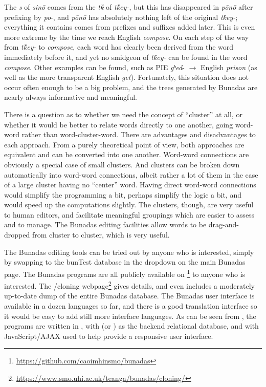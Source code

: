 \documentclass[output=paper,colorlinks,citecolor=brown]{langscibook}
\begin{document}
The \textit{s} of  \textit{sinō} comes from the \textit{tḱ} of \textit{tḱey-}, but this has disappeared in \textit{pōnō} after prefixing by \textit{po}{}-, and \textit{pōnō} has absolutely nothing left of the original \textit{tḱey-}; everything it contains comes from prefixes and suffixes added later. This is even more extreme by the time we reach English \textit{compose}. On each step of the way from \textit{tḱey-} to \textit{compose}, each word has clearly been derived from the word immediately before it, and yet no smidgeon of \textit{tḱey-} can be found in the word \textit{compose}. Other examples can be found, such as PIE \textit{gʰed}{}- $\rightarrow$ English \textit{prison} (as well as the more transparent English \textit{get}). Fortunately, this situation does not occur often enough to be a big problem, and the trees generated by Bunadas are nearly always informative and meaningful.



There is a question as to whether we need the concept of ``cluster” at all, or whether it would be better to relate words directly to one another, going word-word rather than word-cluster-word. There are advantages and disadvantages to each approach. From a purely theoretical point of view, both approaches are equivalent and can be converted into one another. Word-word connections are obviously a special case of small clusters. And clusters can be broken down automatically into word-word connections, albeit rather a lot of them in the case of a large cluster having no ``center” word. Having direct word-word connections would simplify the programming a bit, perhaps simplify the logic a bit, and would speed up the computations slightly. The clusters, though, are very useful to human editors, and facilitate meaningful groupings which are easier to assess and to manage. The Bunadas editing facilities allow words to be drag-and-dropped from cluster to cluster, which is very useful.


The Bunadas editing tools can be tried out by anyone who is interested, simply by swapping to the bunTest database in the dropdown on the main Bunadas page. The Bunadas programs are all publicly available on \footnote{ \url{https://github.com/caoimhinsmo/bunadas} } to anyone who is interested. The /cloning webpage\footnote{\url{https://www.smo.uhi.ac.uk/teanga/bunadas/cloning/} } gives details, and even includes a moderately up-to-date dump of the entire Bunadas database. The Bunadas user interface is available in a dozen languages so far, and there is a good translation interface so it would be easy to add still more interface languages. As can be seen from , the programs are written in , with  (or ) as the backend relational database, and with JavaScript/AJAX  used to help provide a responsive user interface.
\end{document}
